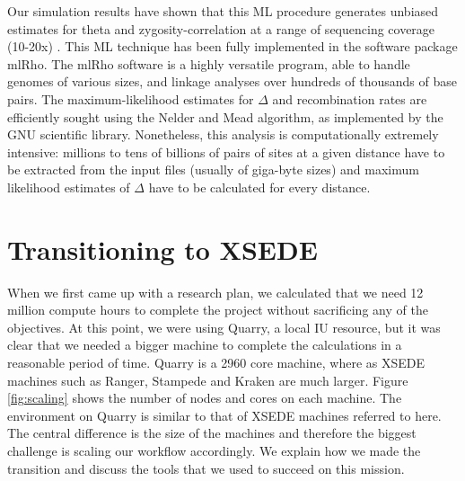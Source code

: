 \documentclass{sig-alternate}
\newcommand{\abhi}[1]{ {\textcolor{red} { ***Abhinav: #1 }}}
\newcommand{\abhi}[1]{ {}}
\begin{document}

Our simulation results have shown that this ML procedure generates unbiased estimates for theta and
zygosity-correlation at a range of sequencing coverage (10-20x) \cite{Lynch01112008}.  This ML technique has
been fully implemented in the software package mlRho. The mlRho software is a highly
versatile program, able to handle genomes of various sizes, and linkage analyses over hundreds of thousands of
base pairs. The maximum-likelihood estimates for $\Delta$ and recombination rates are efficiently sought using
the Nelder and Mead algorithm, as implemented by the GNU scientific library. Nonetheless, this analysis is
computationally extremely intensive: millions to tens of billions of pairs of sites at a given distance have
to be extracted from the input files (usually of giga-byte sizes) and maximum likelihood estimates of $\Delta$
have to be calculated for every distance.


\section{Transitioning to XSEDE}\label{sec:resources}
When we first came up with a research plan, we calculated that we need 12 million compute hours to complete the project without sacrificing any of the objectives. At this point, we were using Quarry, a local IU resource, but it was clear that we needed a bigger machine to complete the calculations in a reasonable period of time. Quarry is a 2960 core machine, where as XSEDE machines such as Ranger, Stampede and Kraken are much larger. Figure \ref{fig:scaling} shows the number of nodes and cores on each machine. The environment on Quarry is similar to that of XSEDE machines referred to here. The central difference is the size of the machines and therefore the biggest challenge is scaling our workflow accordingly. We explain how we made the transition and discuss the tools that we used to succeed on this mission.
%
\end{document}
